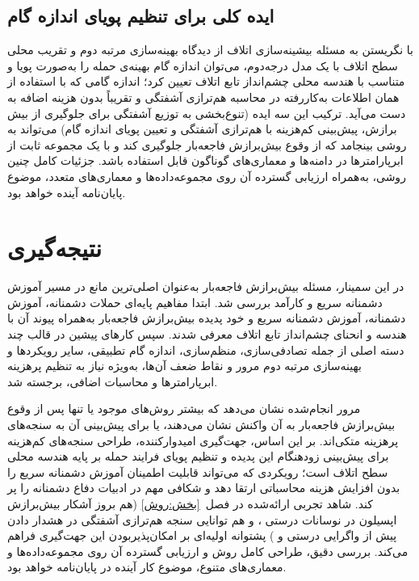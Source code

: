 \documentclass[11pt]{article}
\begin{document}
\subsection{ایده‌ کلی برای تنظیم پویای اندازه‌ گام}

با نگریستن به مسئله‌ بیشینه‌سازی اتلاف از دیدگاه بهینه‌سازی مرتبه دوم
و تقریب محلی سطح اتلاف با یک مدل درجه‌دوم،
می‌توان اندازه‌ گام بهینه‌ی حمله را به‌صورت پویا و متناسب با هندسه‌ محلی چشم‌انداز تابع اتلاف تعیین کرد؛
اندازه‌ گامی که با استفاده از همان اطلاعات به‌کاررفته در محاسبه‌ هم‌ترازی آشفتگی
و تقریباً بدون هزینه‌ اضافه به دست می‌آید.
ترکیب این سه ایده
(تنوع‌بخشی به توزیع آشفتگی برای جلوگیری از بیش برازش، پیش‌بینی کم‌هزینه با هم‌ترازی آشفتگی
و تعیین پویای اندازه‌ گام)
می‌تواند به روشی بینجامد که از وقوع بیش‌برازش فاجعه‌بار جلوگیری کند
و با یک مجموعه‌ ثابت از ابرپارامترها در دامنه‌ها و معماری‌های گوناگون قابل استفاده باشد.
جزئیات کامل چنین روشی، به‌همراه ارزیابی گسترده‌ آن روی مجموعه‌داده‌ها و معماری‌های متعدد،
موضوع پایان‌نامه‌ آینده خواهد بود.

\section{نتیجه‌گیری}\label{بخش:نتیجه}

در این سمینار، مسئله‌ بیش‌برازش فاجعه‌بار به‌عنوان اصلی‌ترین مانع در مسیر آموزش دشمنانه‌ سریع و کارآمد بررسی شد.
ابتدا مفاهیم پایه‌ای حملات دشمنانه، آموزش دشمنانه، آموزش دشمنانه سریع و خود پدیده‌ بیش‌برازش فاجعه‌بار
به‌همراه پیوند آن با هندسه و انحنای چشم‌انداز تابع اتلاف معرفی شدند.
سپس کارهای پیشین در قالب چند دسته‌ اصلی از جمله تصادفی‌سازی، منظم‌سازی، اندازه‌ گام تطبیقی،
سایر رویکردها و بهینه‌سازی مرتبه دوم مرور و نقاط ضعف آن‌ها،
به‌ویژه نیاز به تنظیم پرهزینه‌ ابرپارامترها و محاسبات اضافی، برجسته شد.

مرور انجام‌شده نشان می‌دهد که بیشتر روش‌های موجود یا تنها پس از وقوع بیش‌برازش فاجعه‌بار به آن واکنش نشان می‌دهند،
یا برای پیش‌بینی آن به سنجه‌های پرهزینه متکی‌اند.
بر این اساس، جهت‌گیری امیدوارکننده، طراحی سنجه‌های کم‌هزینه برای پیش‌بینی زودهنگام این پدیده
و تنظیم پویای فرایند حمله بر پایه‌ هندسه‌ محلی سطح اتلاف است؛
رویکردی که می‌تواند قابلیت اطمینان آموزش دشمنانه سریع را بدون افزایش هزینه‌ محاسباتی ارتقا دهد
و شکافی مهم در ادبیات دفاع دشمنانه را پر کند.
شاهد تجربی ارائه‌شده در فصل~\ref{بخش:روش}
(هم بروز آشکار بیش‌برازش اپسیلون در نوسانات درستی ،
و هم توانایی سنجه‌ هم‌ترازی آشفتگی در هشدار دادن پیش از واگرایی درستی  و )
پشتوانه‌ اولیه‌ای بر امکان‌پذیربودن این جهت‌گیری فراهم می‌کند.
بررسی دقیق، طراحی کامل روش و ارزیابی گسترده‌ آن روی مجموعه‌داده‌ها و معماری‌های متنوع،
موضوع کار آینده در پایان‌نامه خواهد بود.
\end{document}
